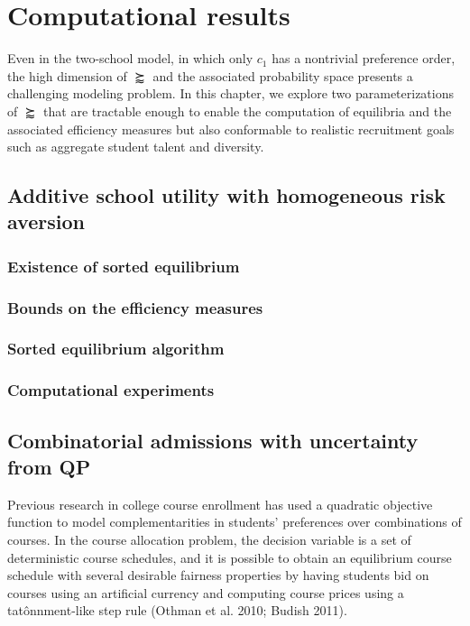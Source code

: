 \documentclass[12pt]{article} %
\theoremstyle{definition}
\theoremstyle{definition}
\begin{document}
\section{Computational results}
Even in the two-school model, in which only $c_1$ has a nontrivial preference order, the high dimension of $\succapprox$ and the associated probability space presents a challenging modeling problem. In this chapter, we explore two parameterizations of $\succapprox$ that are tractable enough to enable the computation of equilibria and the associated efficiency measures but also conformable to realistic recruitment goals such as aggregate student talent and diversity. 

\subsection{Additive school utility with homogeneous risk aversion}


\subsubsection{Existence of sorted equilibrium}
\subsubsection{Bounds on the efficiency measures}
\subsubsection{Sorted equilibrium algorithm}
\subsubsection{Computational experiments}

\subsection{Combinatorial admissions with uncertainty from QP}
Previous research in college course enrollment has used a quadratic objective function to model complementarities in students' preferences over combinations of courses. In the course allocation problem, the decision variable is a set of deterministic course schedules, and it is possible to obtain an equilibrium course schedule with several desirable fairness properties by having students bid on courses using an artificial currency and computing course prices using a tat\^onnment-like step rule (Othman et al. 2010; Budish 2011).
\end{document}
